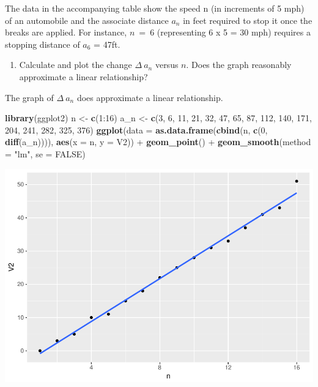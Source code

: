 \documentclass[]{article}
\newenvironment{Shaded}{\begin{snugshade}}{\end{snugshade}}
\newcommand{\KeywordTok}[1]{\textcolor[rgb]{0.13,0.29,0.53}{\textbf{{#1}}}}
\newcommand{\DataTypeTok}[1]{\textcolor[rgb]{0.13,0.29,0.53}{{#1}}}
\newcommand{\DecValTok}[1]{\textcolor[rgb]{0.00,0.00,0.81}{{#1}}}
\newcommand{\StringTok}[1]{\textcolor[rgb]{0.31,0.60,0.02}{{#1}}}
\newcommand{\OtherTok}[1]{\textcolor[rgb]{0.56,0.35,0.01}{{#1}}}
\newcommand{\NormalTok}[1]{{#1}}
\providecommand{\tightlist}{%
  \setlength{\itemsep}{0pt}\setlength{\parskip}{0pt}}
\begin{document}
The data in the accompanying table show the speed n (in increments of 5
mph) of an automobile and the associate distance \(a_n\) in feet
required to stop it once the breaks are applied. For instance, \(n~=~6\)
(representing 6 x 5 = 30 mph) requires a stopping distance of \(a_6\) =
47ft.

\begin{enumerate}
\def\labelenumi{\alph{enumi}.}
\tightlist
\item
  Calculate and plot the change \(\Delta~a_n\) versus \(n\). Does the
  graph reasonably approximate a linear relationship?
\end{enumerate}

The graph of \(\Delta~a_n\) does approximate a linear relationship.

\begin{Shaded}
\begin{Highlighting}[]
\KeywordTok{library}\NormalTok{(ggplot2)}
\NormalTok{n <-}\StringTok{ }\KeywordTok{c}\NormalTok{(}\DecValTok{1}\NormalTok{:}\DecValTok{16}\NormalTok{)}
\NormalTok{a_n <-}\StringTok{ }\KeywordTok{c}\NormalTok{(}\DecValTok{3}\NormalTok{, }\DecValTok{6}\NormalTok{, }\DecValTok{11}\NormalTok{, }\DecValTok{21}\NormalTok{, }\DecValTok{32}\NormalTok{, }\DecValTok{47}\NormalTok{, }\DecValTok{65}\NormalTok{, }\DecValTok{87}\NormalTok{, }\DecValTok{112}\NormalTok{, }\DecValTok{140}\NormalTok{, }\DecValTok{171}\NormalTok{, }\DecValTok{204}\NormalTok{, }\DecValTok{241}\NormalTok{, }\DecValTok{282}\NormalTok{, }\DecValTok{325}\NormalTok{, }\DecValTok{376}\NormalTok{)}
\KeywordTok{ggplot}\NormalTok{(}\DataTypeTok{data =} \KeywordTok{as.data.frame}\NormalTok{(}\KeywordTok{cbind}\NormalTok{(n, }\KeywordTok{c}\NormalTok{(}\DecValTok{0}\NormalTok{, }\KeywordTok{diff}\NormalTok{(a_n)))), }\KeywordTok{aes}\NormalTok{(}\DataTypeTok{x =} \NormalTok{n, }\DataTypeTok{y =} \NormalTok{V2)) +}\StringTok{ }
\StringTok{        }\KeywordTok{geom_point}\NormalTok{() +}\StringTok{ }
\StringTok{        }\KeywordTok{geom_smooth}\NormalTok{(}\DataTypeTok{method =} \StringTok{"lm"}\NormalTok{, }\DataTypeTok{se =} \OtherTok{FALSE}\NormalTok{)}
\end{Highlighting}
\end{Shaded}

\includegraphics{CHunt_homework1_files/figure-latex/unnamed-chunk-2-1.pdf}
\end{document}
